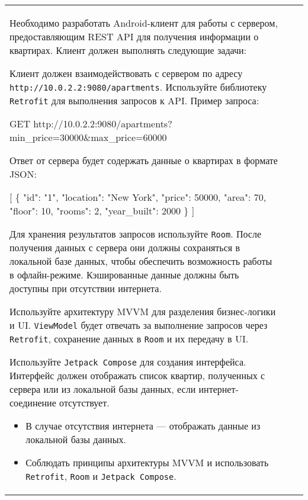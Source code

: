 \documentclass[a4paper]{article}
\begin{document}
\begin{tabular}{!{\vrule width 2pt}p{5cm}|p{6cm}|p{4cm}!{\vrule width 2pt}}
{\begin{minipage}{16cm}
\begin{enumerate}
Необходимо разработать Android-клиент для работы с сервером, предоставляющим REST API для получения информации о квартирах. Клиент должен выполнять следующие задачи:

Клиент должен взаимодействовать с сервером по адресу \texttt{http://10.0.2.2:9080/apartments}. Используйте библиотеку \texttt{Retrofit} для выполнения запросов к API. Пример запроса:


GET http://10.0.2.2:9080/apartments?min\_price=30000\&max\_price=60000


Ответ от сервера будет содержать данные о квартирах в формате JSON:


[
  \{
    "id": "1",
    "location": "New York",
    "price": 50000,
    "area": 70,
    "floor": 10,
    "rooms": 2,
    "year\_built": 2000
  \}
]


Для хранения результатов запросов используйте \texttt{Room}. После получения данных с сервера они должны сохраняться в локальной базе данных, чтобы обеспечить возможность работы в офлайн-режиме. Кэшированные данные должны быть доступны при отсутствии интернета.

Используйте архитектуру MVVM для разделения бизнес-логики и UI. \texttt{ViewModel} будет отвечать за выполнение запросов через \texttt{Retrofit}, сохранение данных в \texttt{Room} и их передачу в UI.

Используйте \texttt{Jetpack Compose} для создания интерфейса. Интерфейс должен отображать список квартир, полученных с сервера или из локальной базы данных, если интернет-соединение отсутствует.

\begin{itemize}
  \item В случае отсутствия интернета — отображать данные из локальной базы данных.
  \item Соблюдать принципы архитектуры MVVM и использовать \texttt{Retrofit}, \texttt{Room} и \texttt{Jetpack Compose}.
\end{itemize} 
\end{enumerate}


\end{minipage}}
\end{tabular}
\end{document}
